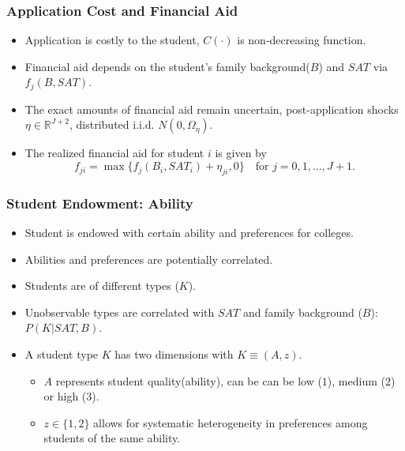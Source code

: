 \documentclass[10pt]{beamer}
\begin{document}
\begin{frame}[c]\frametitle{Application Cost and Financial Aid}
\begin{itemize}
    \item Application is costly to the student, $C(\cdot)$ is non-decreasing function.
    \item Financial aid depends on the student's family background($B$) and $SAT$ via $f_{j}(B,SAT)$.
    \item The exact amounts of financial aid remain uncertain, post-application shocks $\eta \in \mathbb{R}^{J+2}$, distributed i.i.d. $N(0,\Omega_{\eta})$.
    \item  The realized financial aid for student $i$ is given by
    \begin{equation*}
        f_{ji} = \max\{f_{j}(B_{i},SAT_{i})+\eta_{ji},0\}\quad \text{for } j=0,1,\ldots,J+1.
    \end{equation*}

\end{itemize}
\end{frame}

\begin{frame}[c]\frametitle{Student Endowment: Ability}
\begin{itemize}
    \item Student is endowed with certain ability and preferences for colleges.
    \item Abilities and preferences are potentially correlated.
    \item Students are of different types ($K$).
    \item Unobservable types are correlated with $SAT$ and family background ($B$): $P(K|SAT,B)$.
    \item A student type $K$ has two dimensions with $K\equiv (A,z)$.
    \begin{itemize}
        \item $A$  represents student quality(ability), can be can be low ($1$), medium ($2$) or high ($3$).
        \item $z\in \{1,2\}$ allows for systematic heterogeneity in preferences among students of the same ability.
    \end{itemize}
\end{itemize}
\end{frame}
\end{document}

